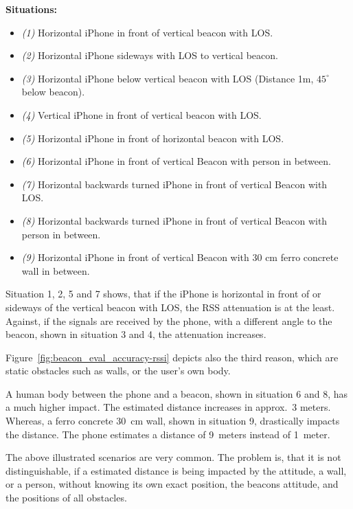 \textbf{Situations:}
\begin{itemize}
  \item \emph{(1)} Horizontal iPhone in front of vertical beacon with \acs{LOS}.
  \item \emph{(2)} Horizontal iPhone sideways with \acs{LOS} to vertical beacon.
  \item \emph{(3)} Horizontal iPhone below vertical beacon with \acs{LOS} (Distance 1m, $45^\circ$ below beacon).
  \item \emph{(4)} Vertical iPhone in front of vertical beacon with \acs{LOS}.
  \item \emph{(5)} Horizontal iPhone in front of horizontal beacon with \acs{LOS}.
  \item \emph{(6)} Horizontal iPhone in front of vertical Beacon with person in between.
  \item \emph{(7)} Horizontal backwards turned iPhone in front of vertical Beacon with \acs{LOS}.
  \item \emph{(8)} Horizontal backwards turned iPhone in front of vertical Beacon with person in between.
  \item \emph{(9)} Horizontal iPhone in front of vertical Beacon with 30 cm ferro concrete wall in between.
\end{itemize}

Situation 1, 2, 5 and 7 shows, that if the iPhone is horizontal in front of or sideways of the vertical beacon with \acs{LOS}, the \acs{RSS} attenuation is at the least. Against, if the signals are received by the phone, with a different angle to the beacon, shown in situation 3 and 4, the attenuation increases.

Figure~\ref{fig:beacon_eval_accuracy-rssi} depicts also the third reason, which are static obstacles such as walls, or the user's own body.

A human body between the phone and a beacon, shown in situation 6 and 8, has a much higher impact. The estimated distance increases in approx.\ 3 meters. Whereas, a ferro concrete 30~cm wall, shown in situation 9, drastically impacts the distance. The phone estimates a distance of 9~meters instead of 1~meter.

The above illustrated scenarios are very common. The problem is, that it is not distinguishable, if a estimated distance is being impacted by the attitude, a wall, or a person, without knowing its own exact position, the beacons attitude, and the positions of all obstacles.\newline

